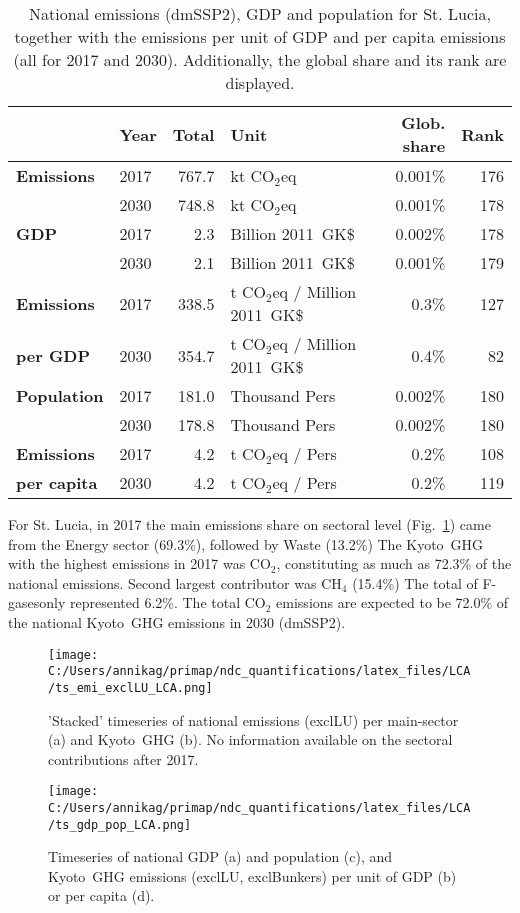 \documentclass[12pt]{article}
\begin{document}
 \begin{table}[H]
 \centering
 \caption{National emissions (dmSSP2), GDP and population for St. Lucia, together with the emissions per unit of GDP and per capita emissions (all for 2017 and 2030). 
 Additionally, the global share and its rank are displayed.}
 \label{tab:overview}
 \begin{tabular}{l || l r l r r}
 \bfseries  & \bfseries Year & \bfseries Total & \bfseries Unit & \bfseries Glob. share & \bfseries Rank \tabularnewline \hline \hline
 \bfseries Emissions & 2017 & 767.7 & kt CO$_2$eq & 0.001\% & 176 \tabularnewline 
 \bfseries  & 2030 & 748.8 & kt CO$_2$eq & 0.001\% & 178 \tabularnewline \hline
 \bfseries GDP & 2017 & 2.3 & Billion 2011~GK\$ & 0.002\% & 178 \tabularnewline 
 \bfseries  & 2030 & 2.1 & Billion 2011~GK\$ & 0.001\% & 179 \tabularnewline \hline
 \bfseries Emissions & 2017 & 338.5 & t CO$_2$eq / Million 2011~GK\$ & 0.3\% & 127 \tabularnewline 
 \bfseries per GDP & 2030 & 354.7 & t CO$_2$eq / Million 2011~GK\$ & 0.4\% & 82 \tabularnewline \hline
 \bfseries Population & 2017 & 181.0 & Thousand Pers & 0.002\% & 180 \tabularnewline 
 \bfseries  & 2030 & 178.8 & Thousand Pers & 0.002\% & 180 \tabularnewline \hline
 \bfseries Emissions & 2017 & 4.2 & t CO$_2$eq /  Pers & 0.2\% & 108 \tabularnewline 
 \bfseries per capita & 2030 & 4.2 & t CO$_2$eq /  Pers & 0.2\% & 119 \tabularnewline 
 \end{tabular}
 \end{table}

 For St. Lucia, in 2017 the main emissions share on sectoral level (Fig.~\ref{fig:tsEmi}) came from the Energy sector (69.3\%), followed by Waste (13.2\%)
 The Kyoto~GHG with the highest emissions in 2017 was CO$_2$, constituting as much as 72.3\% of the national emissions. 
 Second largest contributor was CH$_4$ (15.4\%)
 The total of F-gasesonly represented 6.2\%.
 The total CO$_2$ emissions are expected to be 72.0\% of the national Kyoto~GHG emissions in 2030 (dmSSP2).

 \begin{figure}[H]
 \centering
 \texttt{[image: C:/Users/annikag/primap/ndc\_quantifications/latex\_files/LCA/ts\_emi\_exclLU\_LCA.png]}
 \caption{'Stacked' timeseries of national emissions (exclLU) per main-sector (a) and Kyoto~GHG (b). 
 No information available on the sectoral contributions after 2017.}
 \label{fig:tsEmi}
 \end{figure}

 \begin{figure}[H]
 \centering
 \texttt{[image: C:/Users/annikag/primap/ndc\_quantifications/latex\_files/LCA/ts\_gdp\_pop\_LCA.png]}
 \caption{Timeseries of national GDP (a) and population (c), and Kyoto~GHG emissions (exclLU, exclBunkers) per unit of GDP (b) or per capita (d).}
 \label{fig:tsSocioEco}
 \end{figure}
\end{document}
